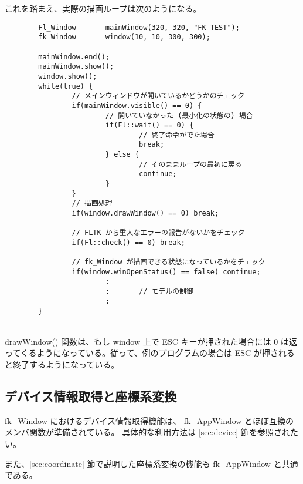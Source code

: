 これを踏まえ、実際の描画ループは次のようになる。
\\
\begin{breakbox}
\begin{verbatim}
        Fl_Window       mainWindow(320, 320, "FK TEST");
        fk_Window       window(10, 10, 300, 300);

        mainWindow.end();
        mainWindow.show();      
        window.show();
        while(true) {
                // メインウィンドウが開いているかどうかのチェック
                if(mainWindow.visible() == 0) {
                        // 開いていなかった (最小化の状態の) 場合
                        if(Fl::wait() == 0) {
                                // 終了命令がでた場合
                                break;
                        } else {
                                // そのままループの最初に戻る
                                continue;
                        }
                }
                // 描画処理
                if(window.drawWindow() == 0) break;

                // FLTK から重大なエラーの報告がないかをチェック
                if(Fl::check() == 0) break;

                // fk_Window が描画できる状態になっているかをチェック
                if(window.winOpenStatus() == false) continue;
                        :
                        :       // モデルの制御
                        :
        }       
\end{verbatim}
\end{breakbox}
~ \\
drawWindow() 関数は、もし window 上で ESC キーが押された場合には
0 は返ってくるようになっている。従って、例のプログラムの場合は
ESC が押されると終了するようになっている。

\subsection{デバイス情報取得と座標系変換}
fk\_Window におけるデバイス情報取得機能は、
fk\_AppWindow とほぼ互換のメンバ関数が準備されている。
具体的な利用方法は \ref{sec:device} 節を参照されたい。

また、\ref{sec:coordinate} 節で説明した座標系変換の機能も
fk\_AppWindow と共通である。

